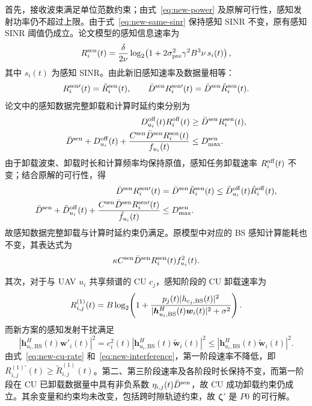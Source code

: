 \documentclass[11pt,a4paper]{ctexart}
\begin{document}
首先，接收波束满足单位范数约束；由式~\eqref{eq:new-power} 及原解可行性，感知发射功率仍不超过上限。由于式~\eqref{eq:new-same-sinr} 保持感知 SINR 不变，原有感知 SINR 阈值仍成立。论文模型的感知信息速率为
\begin{equation}\label{eq:new-rate-formula}
R_i^{\rm sen}(t)=\frac{\delta}{2\nu}\log_2\!\left(1+2\sigma_{\rm pre}^2\gamma^2B^3\nu\,s_i(t)\right),
\end{equation}
其中 $s_i(t)$ 为感知 SINR。由此新旧感知速率及数据量相等：
\begin{equation}\label{eq:new-same-rate}
R_i^{\rm sen\prime}(t)=\tilde R_i^{\rm sen}(t),\qquad
\bar D^{\rm sen}R_i^{\rm sen\prime}(t)=\bar D^{\rm sen}\tilde R_i^{\rm sen}(t).
\end{equation}
论文中的感知数据完整卸载和计算时延约束分别为
\begin{align}\label{eq:new-model-off}
D_{u_i}^{\rm off}(t) R_i^{\rm off}(t)&\ge\bar D^{\rm sen}R_i^{\rm sen}(t),\\
\bar D^{\rm sen}+D_{u_i}^{\rm off}(t)+\frac{C^{\rm sen}\bar D^{\rm sen}R_i^{\rm sen}(t)}{f_{u_i}(t)}&\le D_{\max}^{\rm sen}.\label{eq:new-model-delay}
\end{align}
由于卸载波束、卸载时长和计算频率均保持原值，感知任务卸载速率 $R_i^{\rm off}(t)$ 不变；结合原解的可行性，得
\begin{align}
\bar D^{\rm sen}R_i^{\rm sen\prime}(t)&=\bar D^{\rm sen}\tilde R_i^{\rm sen}(t)\le\tilde D_{u_i}^{\rm off}(t)\tilde R_i^{\rm off}(t),\label{eq:new-off}\\
\bar D^{\rm sen}+\tilde D_{u_i}^{\rm off}(t)+\frac{C^{\rm sen}\bar D^{\rm sen}R_i^{\rm sen\prime}(t)}{\tilde f_{u_i}(t)}&\le D_{\max}^{\rm sen}.\label{eq:new-delay}
\end{align}
故感知数据完整卸载与计算时延约束仍满足。原模型中对应的 BS 感知计算能耗也不变，其表达式为
\[
\kappa C^{\rm sen}\bar D^{\rm sen}R_i^{\rm sen}(t) f_{u_i}^2(t).
\]

其次，对于与 UAV $u_i$ 共享频谱的 CU $c_j$，感知阶段的 CU 卸载速率为
\begin{equation}\label{eq:new-cu-rate}
R_{i,j}^{(1)}(t)=B\log_2\!\left(1+\frac{p_j(t)|h_{c_j,\rm BS}(t)|^2}{|\bm h_{u_i,\rm BS}^H(t)\bm w_i(t)|^2+\sigma^2}\right).
\end{equation}
而新方案的感知发射干扰满足
\begin{equation}\label{eq:new-interference}
\left|\bm h_{u_i,\mathrm{BS}}^H(t)\bm w'_i(t)\right|^2=c_i^2(t)\left|\bm h_{u_i,\mathrm{BS}}^H(t)\tilde{\bm w}_i(t)\right|^2\le\left|\bm h_{u_i,\mathrm{BS}}^H(t)\tilde{\bm w}_i(t)\right|^2.
\end{equation}
由式~\eqref{eq:new-cu-rate} 和~\eqref{eq:new-interference}，第一阶段速率不降低，即 $R_{i,j}^{(1)\prime}(t)\ge\tilde R_{i,j}^{(1)}(t)$。第二、第三阶段速率及各阶段时长保持不变，而第一阶段在 CU 已卸载数据量中具有非负系数 $\eta_{i,j}(t)\bar D^{\rm sen}$，故 CU 成功卸载约束仍成立。其余变量和约束均未改变，包括跨时隙轨迹约束，故 $\bm\zeta'$ 是 $P0$ 的可行解。
\end{document}
